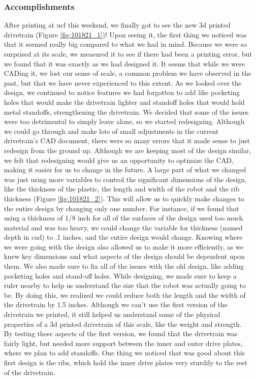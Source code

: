 \subsubsection*{Accomplishments}
After printing at ucf this weekend, we finally got to see the new 3d printed drivetrain (Figure \ref{fig:101821_1})! Upon seeing it, the first thing we noticed was that it seemed really big compared to what we had in mind. Because we were so surprised at its scale, we measured it to see if there had been a printing error, but we found that it was exactly as we had designed it. It seems that while we were CADing it, we lost our sense of scale, a common problem we have observed in the past, but that we have never experienced to this extent. As we looked over the design, we continued to notice features we had forgotten to add like pocketing holes that would make the drivetrain lighter and standoff holes that would hold metal standoffs, strengthening the drivetrain. We decided that some of the issues were too detrimental to simply leave alone, so we started redesigning. 
Although we could go through and make lots of small adjustments in the current drivetrain’s CAD document, there were so many errors that it made sense to just redesign from the ground up. Although we are keeping most of the design similar, we felt that redesigning would give us an opportunity to optimize the CAD, making it easier for us to change in the future. A large part of what we changed was just using more variables to control the significant dimensions of the design, like the thickness of the plastic, the length and width of the robot and the rib thickness (Figure \ref{fig:101821_2}). This will allow us to quickly make changes to the entire design by changing only one number. For instance, if we found that using a thickness of 1/8 inch for all of the surfaces of the design used too much material and was too heavy, we could change the variable for thickness (named depth in cad) to .1 inches, and the entire design would change. Knowing where we were going with the design also allowed us to make it more efficiently, as we knew key dimensions and what aspects of the design should be dependent upon them. We also made sure to fix all of the issues with the old design, like adding pocketing holes and stand-off holes. While designing, we made sure to keep a ruler nearby to help us understand the size that the robot was actually going to be. By doing this, we realized we could reduce both the length and the width of the drivetrain by 1.5 inches. Although we can't use the first version of the drivetrain we printed, it still helped us understand some of the physical properties of a 3d printed drivetrain of this scale, like the weight and strength. By testing these aspects of the first version, we found that the drivetrain was fairly light, but needed more support between the inner and outer drive plates, where we plan to add standoffs. One thing we noticed that was good about this first design is the ribs, which hold the inner drive plates very sturdily to the rest of the drivetrain.
